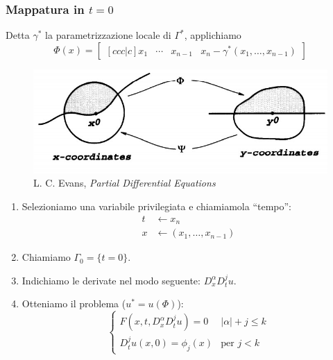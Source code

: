 \documentclass[serif,notheorems]{beamer}
\theoremstyle{definition} %
\theoremstyle{remark}
\begin{document}
\begin{frame}
\frametitle{Mappatura in $t=0$}
Detta $\gamma^*$ la parametrizzazione locale di $\Gamma^*$, applichiamo
$$\Phi (x) = 
\begin{bmatrix}[ccc|c]
x_1 & \cdots & x_{n-1} & x_n-\gamma^* (x_1,\ldots , x_{n-1})
\end{bmatrix}$$
\begin{figure}[H]
\centering
\includegraphics[scale=.35]{flatb}
\caption{\tiny{L. C. Evans, \textit{Partial Differential Equations}}}
\end{figure}
\end{frame}

\begin{frame}
\begin{enumerate}
\item Selezioniamo una variabile privilegiata e chiamiamola ``tempo'':
\begin{align*}
t & \leftarrow x_n \\
x & \leftarrow (x_1,\ldots , x_{n-1})
\end{align*}
\item Chiamiamo $\Gamma_0 = \{t=0\}$.
\item Indichiamo le derivate nel modo seguente: $D^\alpha_x D^j_t u$.
\item Otteniamo il problema ($u^*=u(\Phi)$):
\begin{equation*}
\begin{cases}
F(x,t, D^\alpha_x D^j_t u)=0 & |\alpha | +j \leq k\\
D^j_t u (x,0)= \phi_j(x) & \text{per }j<k 
\end{cases}
\end{equation*}
\end{enumerate}
\end{frame}
\end{document}
